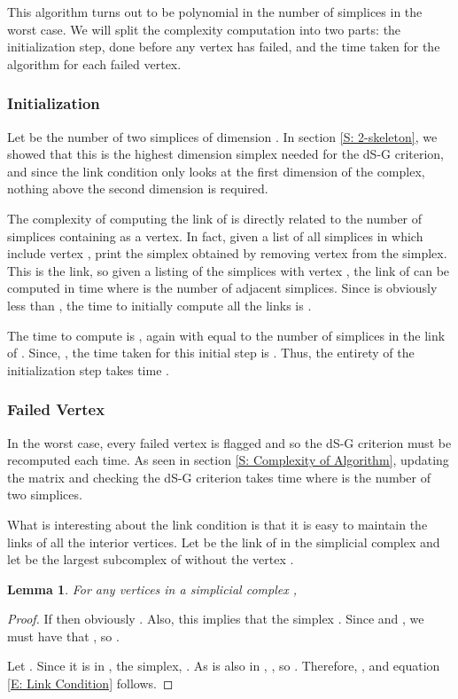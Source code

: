 \documentclass[10pt,twocolumn]{article} \usepackage{amsmath,epsf,amssymb,cite,pifont,amsthm, mathrsfs,epsfig,  bbm, amsthm,  setspace}
\newtheorem{lemma}{Lemma}
\renewcommand{\1}{\mathbbm{1}}
\begin{document}
This algorithm turns out to be polynomial in the number of simplices in the worst case.
We will split the complexity computation into two parts: the initialization step, done before any vertex has failed, and the time taken for the algorithm for each failed vertex.

\subsubsection*{Initialization}

Let  be the number of two simplices of dimension .  In section \ref{S: 2-skeleton}, we showed that this is the highest dimension simplex needed for the dS-G criterion, and since the link condition only looks at the first dimension of the complex, nothing above the second dimension is required.

The complexity of computing the link of  is directly related to the number of simplices containing  as a vertex.
In fact, given a list of all simplices in  which include vertex , print the simplex obtained by removing vertex  from the simplex.
This is the link, so given a listing of the simplices with vertex , the link of  can be computed in time  where  is the number of adjacent simplices.
Since  is obviously less than , the time to initially compute all the links is .

The time to compute  is , again with  equal to the number of simplices in the link of .  Since, , the time taken for this initial step is .
Thus, the entirety of the initialization step takes time .

\subsubsection*{Failed Vertex}

In the worst case, every failed vertex is flagged and so the dS-G criterion must be recomputed each time.
As seen in section \ref{S: Complexity of Algorithm}, updating the matrix  and checking the dS-G criterion takes time  where  is the number of two simplices.


What is interesting about the link condition is that it is easy to maintain the links of all the interior vertices.
  Let  be the link of  in the simplicial complex  and let  be the largest subcomplex of  without the vertex .

\begin{lemma}
For any vertices  in a simplicial complex ,

\end{lemma}
\begin{proof}
 If  then obviously .
 Also, this implies that the simplex .
 Since  and , we must have that , so .

 Let . Since it is in , the simplex, .
 As  is also in , , so .  Therefore, , and equation \ref{E: Link Condition} follows.
\end{proof}
\end{document}
